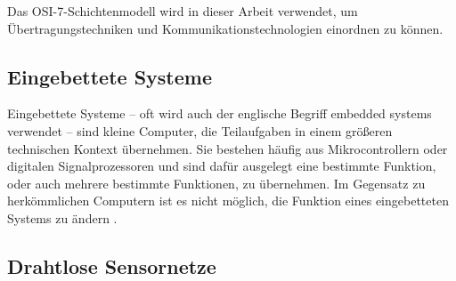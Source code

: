 \begin{table}[h]
\caption{OSI-7-Schichtenmodell}
\label{tab:OSI-7-Schichtenmodell}
\end{table}

Das OSI-7-Schichtenmodell wird in dieser Arbeit verwendet, um Übertragungstechniken und Kommunikationstechnologien einordnen zu können.

\subsection{Eingebettete Systeme}

Eingebettete Systeme  -- oft wird auch der englische Begriff embedded systems verwendet -- sind kleine Computer, die Teilaufgaben in einem größeren technischen Kontext übernehmen. Sie bestehen häufig aus Mikrocontrollern oder digitalen Signalprozessoren und sind dafür ausgelegt eine bestimmte Funktion, oder auch mehrere bestimmte Funktionen, zu übernehmen. Im Gegensatz zu herkömmlichen Computern ist es nicht möglich, die Funktion eines eingebetteten Systems zu ändern \cite{Heath:EmbeddedSystemsDesign}.

\subsection{Drahtlose Sensornetze}

